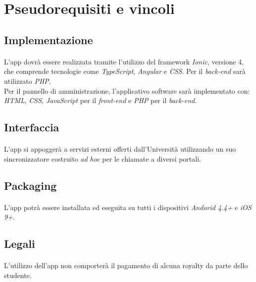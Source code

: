 \section{Pseudorequisiti e vincoli}
\subsection{Implementazione}
\paragraph{}
L’app dovrà essere realizzata tramite l’utilizzo del framework \textit{Ionic}, versione 4, che comprende tecnologie come \emph{TypeScript}, \emph{Angular} e \emph{CSS}.
Per il \emph{back-end} sarà utilizzato \emph{PHP}.\\
Per il pannello di amministrazione, l'applicativo software sarà implementato con:\\
\emph{HTML}, \emph{CSS}, \emph{JavaScript} per il \emph{front-end} e \emph{PHP} per il \emph{back-end}.


\subsection{Interfaccia}
\paragraph{}
L’app si appoggerà a servizi esterni offerti dall’Università utilizzando un suo sincronizzatore costruito \textit{ad hoc} per le chiamate a diversi portali.

\subsection{Packaging}
\paragraph{}
L’app potrà essere installata ed eseguita su tutti i dispositivi \textit{Andorid 4.4+} e \textit{iOS 9+}.

\subsection{Legali}
\paragraph{}
L’utilizzo dell’app non comporterà il pagamento di alcuna royalty da parte dello studente.


\clearpage